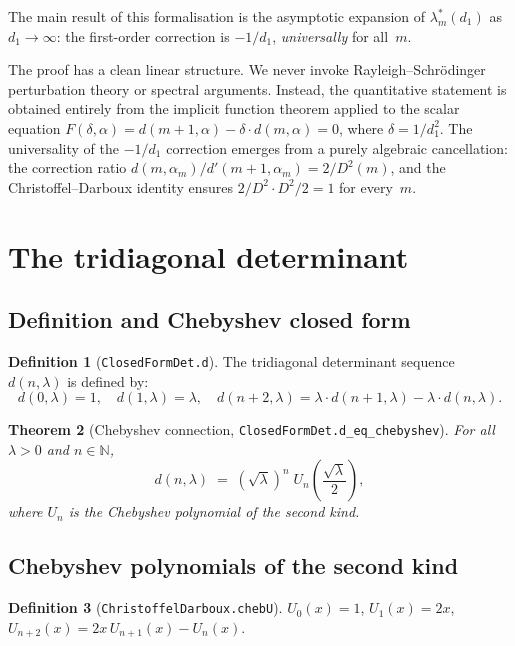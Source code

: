 \documentclass[11pt,a4paper]{article}
\theoremstyle{plain}
\newtheorem{theorem}{Theorem}[section]
\theoremstyle{definition}
\newtheorem{definition}[theorem]{Definition}
\newcommand{\N}{\mathbb{N}}
\newcommand{\Dsq}{D^2}
\newcommand{\alpham}{\alpha_m}
\newcommand{\chebU}{U}
\newcommand{\lean}[1]{\texttt{#1}}
\begin{document}
The main result of this formalisation is the asymptotic expansion
of $\lambda^*_m(d_1)$ as $d_1 \to \infty$: the first-order correction
is $-1/d_1$, \emph{universally} for all~$m$.

The proof has a clean linear structure.  We never invoke
Rayleigh--Schr\"odinger perturbation theory or spectral arguments.
Instead, the quantitative statement is obtained entirely from
the implicit function theorem applied to the scalar equation
$F(\delta, \alpha) = d(m{+}1,\alpha) - \delta \cdot d(m,\alpha) = 0$,
where $\delta = 1/d_1^2$.
The universality of the $-1/d_1$ correction emerges from a
purely algebraic cancellation: the correction ratio
$d(m,\alpham)/d'(m{+}1,\alpham) = 2/\Dsq(m)$, and the
Christoffel--Darboux identity ensures $2/\Dsq \cdot \Dsq/2 = 1$
for every~$m$.

\section{The tridiagonal determinant}
\label{sec:balanced}

\subsection{Definition and Chebyshev closed form}

\begin{definition}[\lean{ClosedFormDet.d}]
The tridiagonal determinant sequence $d(n,\lambda)$ is defined by:
\[
  d(0,\lambda) = 1, \quad d(1,\lambda) = \lambda, \quad
  d(n{+}2,\lambda) = \lambda \cdot d(n{+}1,\lambda) - \lambda \cdot d(n,\lambda).
\]
\end{definition}

\begin{theorem}[Chebyshev connection, \lean{ClosedFormDet.d\_eq\_chebyshev}]
\label{thm:d-chebyshev}
For all $\lambda > 0$ and $n \in \N$,
\[
  d(n,\lambda) \;=\; (\sqrt{\lambda})^n \;\chebU_n\!\left(\frac{\sqrt{\lambda}}{2}\right),
\]
where $\chebU_n$ is the Chebyshev polynomial of the second kind.
\end{theorem}

\subsection{Chebyshev polynomials of the second kind}

\begin{definition}[\lean{ChristoffelDarboux.chebU}]
\label{def:chebU}
$\chebU_0(x) = 1$, $\chebU_1(x) = 2x$,
$\chebU_{n+2}(x) = 2x\,\chebU_{n+1}(x) - \chebU_n(x)$.
\end{definition}
\end{document}
